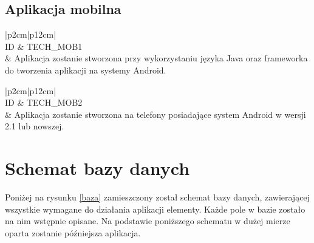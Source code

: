 \documentclass[a4paper]{article}
\begin{document}
\subsection{Aplikacja mobilna}

\begin{table}[h!] 
\centering
\caption{Wymaganie techniczne aplikacji internetowej TECH\_MOB1}
\begin{tabular}{|p{2cm}|p{12cm}|} \hline	
	\\ 
	\hline ID & TECH\_MOB1 \\ 
	\hline \hline
	  & Aplikacja zostanie stworzona przy wykorzystaniu języka
	 Java oraz frameworka do tworzenia aplikacji na systemy Android. \\
	 \hline
	
\end{tabular}
\label{tech_mob1}
\end{table}


\begin{table}[h!] 
\centering
\caption{Wymaganie techniczne aplikacji internetowej TECH\_MOB2}
\begin{tabular}{|p{2cm}|p{12cm}|} \hline 	
	\\ 
	\hline ID & TECH\_MOB2 \\ 
	\hline \hline
	  & Aplikacja zostanie stworzona na telefony posiadające system Android w wersji 2.1 lub nowszej. \\
	 \hline
	
\end{tabular}
\label{tech_mob2}
\end{table}

\section{Schemat bazy danych}
Poniżej na rysunku \ref{baza} zamieszczony został schemat bazy danych, zawierającej wszystkie wymagane do działania aplikacji
elementy.
Każde pole w bazie zostało na nim wstępnie opisane.
Na podstawie poniższego schematu w dużej mierze oparta zostanie późniejsza aplikacja.
\end{document}
